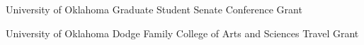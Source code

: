{%
	University of Oklahoma}
{%
	Graduate Student Senate Conference Grant}
{}

{%
	University of Oklahoma}
{%
	Dodge Family College of Arts and Sciences Travel Grant}
{}

